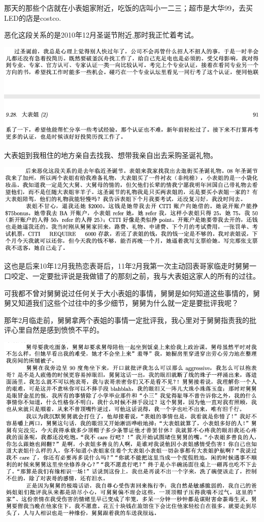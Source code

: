 \documentclass[9pt, b5paper]{article}
\begin{document}
那天的那些个店就在小表姐家附近，吃饭的店叫小一二三；超市是大华99，去买LED的店是costco.

恶化这段关系的是2010年12月圣诞节附近,那时我正忙着考试。 

\begin{center}
\includegraphics[width=.9\linewidth]{./pic/p1p91.png}
\end{center}

大表姐到我租住的地方亲自去找我、想带我亲自出去采购圣诞礼物。

\begin{center}
\includegraphics[width=.9\linewidth]{./pic/p1p48-2.png}
\end{center}

这也是后来10年12月我热恋表哥后，11年2月我第一次主动回表哥家临走时舅舅一口咬定、一定要批评说是我做错了的那刻之前，我与大表姐这家人的所有的过往。

可我都不曾对舅舅说过任何关于大小表姐的事情，舅舅是如何知道这些事情的，舅舅又知道我们这些个过往中的多少细节，舅舅为什么就一定是要批评我呢？

那年2月临走前，舅舅拿两个表姐的事情一定批评我，我心里对于舅舅指责我的批评心里自然是感到愤愤不平的。 

\begin{center}
\includegraphics[width=.9\linewidth]{./pic/p1p51.png}
\end{center}  
\end{document}
